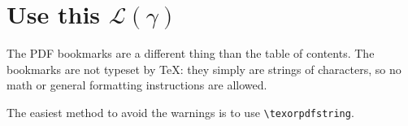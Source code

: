 
\section{Use this \texorpdfstring{$\mathcal{L}(\gamma)$}{Lg}}

The PDF bookmarks are a different thing than the table of contents. The bookmarks are not typeset by TeX: they simply are strings of characters, so no math or general formatting instructions are allowed.

The easiest method to avoid the warnings is to use \verb|\texorpdfstring|.